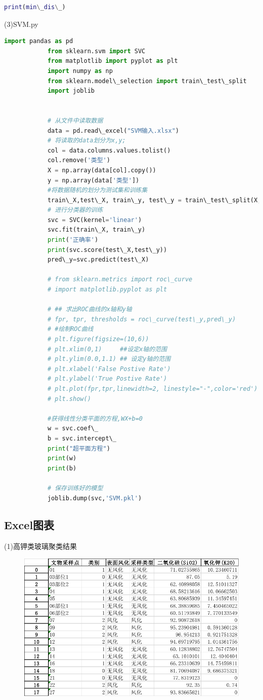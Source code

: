 \documentclass[withoutpreface,bwprint]{cumcmthesis}
\begin{document}
\begin{appendices}
\begin{lstlisting}[language=MATLAB]
			print(min\_dis\_)
		\end{lstlisting}

		(3)SVM.py 
		\begin{lstlisting}[language=Python]
			import pandas as pd
			from sklearn.svm import SVC
			from matplotlib import pyplot as plt
			import numpy as np  
			from sklearn.model\_selection import train\_test\_split
			import joblib
			
			
			# 从文件中读取数据
			data = pd.read\_excel("SVM输入.xlsx")
			# 将读取的data划分为x,y;
			col = data.columns.values.tolist()
			col.remove('类型')
			X = np.array(data[col].copy())
			y = np.array(data['类型'])
			#将数据随机的划分为测试集和训练集
			train\_X,test\_X, train\_y, test\_y = train\_test\_split(X,y,test\_size = 0.2,random\_state = 0)
			# 进行分类器的训练
			svc = SVC(kernel='linear')
			svc.fit(train\_X, train\_y)
			print('正确率')
			print(svc.score(test\_X,test\_y))
			pred\_y=svc.predict(test\_X)
			
			# from sklearn.metrics import roc\_curve
			# import matplotlib.pyplot as plt
			 
			# ## 求出ROC曲线的x轴和y轴
			# fpr, tpr, thresholds = roc\_curve(test\_y,pred\_y)
			# #绘制ROC曲线
			# plt.figure(figsize=(10,6))
			# plt.xlim(0,1)     ##设定x轴的范围
			# plt.ylim(0.0,1.1) ## 设定y轴的范围
			# plt.xlabel('False Postive Rate')
			# plt.ylabel('True Postive Rate')
			# plt.plot(fpr,tpr,linewidth=2, linestyle="-",color='red')
			# plt.show()
			
			#获得线性分类平面的方程,WX+b=0
			w = svc.coef\_  
			b = svc.intercept\_
			print("超平面方程")
			print(w)
			print(b)
			
			# 保存训练好的模型
			joblib.dump(svc,'SVM.pkl')
		\end{lstlisting}

		\subsection{Excel图表}

		(1)高钾类玻璃聚类结果
		\begin{figure}[H]
			\centering
			\includegraphics{高钾类聚类}
		\end{figure}


\end{appendices}
\end{document}
